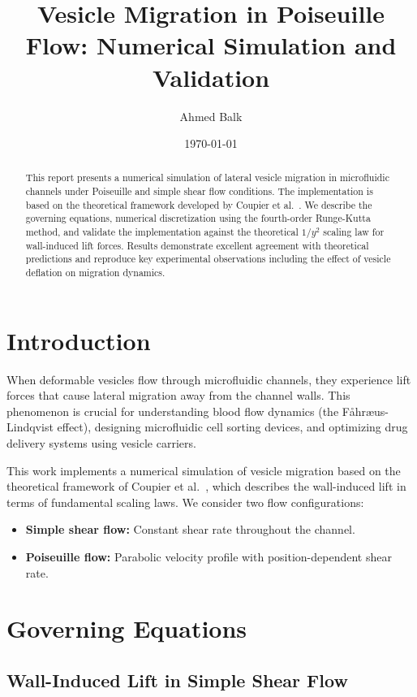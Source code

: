 \documentclass{article}
\title{Vesicle Migration in Poiseuille Flow: Numerical Simulation and Validation}
\author{Ahmed Balk}
\date{\today}
\begin{document}
\maketitle 
{}

\begin{abstract}
This report presents a numerical simulation of lateral vesicle migration in microfluidic 
channels under Poiseuille and simple shear flow conditions. 
The implementation is based on the theoretical framework developed 
by Coupier et al.~\cite{coupier2009}. We describe the governing equations,
numerical discretization using the fourth-order Runge-Kutta method, 
and validate the implementation against the theoretical $1/y^2$ scaling law 
for wall-induced lift forces. Results demonstrate excellent agreement with 
theoretical predictions and reproduce key experimental observations including 
the effect of vesicle deflation on migration dynamics.
\end{abstract}

\section{Introduction}

When deformable vesicles flow through microfluidic channels, 
they experience lift forces that cause lateral migration away 
from the channel walls. This phenomenon is crucial for understanding
blood flow dynamics (the F\aa hr\ae us-Lindqvist effect), 
designing microfluidic cell sorting devices, and optimizing drug 
delivery systems using vesicle carriers.

This work implements a numerical simulation of vesicle migration 
based on the theoretical framework of Coupier et al.~\cite{coupier2009}, 
which describes the wall-induced lift in terms of fundamental scaling laws. 
We consider two flow configurations:
\begin{itemize}
    \item \textbf{Simple shear flow:} Constant shear rate throughout the channel.
    \item \textbf{Poiseuille flow:} Parabolic velocity profile with position-dependent shear rate.
\end{itemize}

\section{Governing Equations}

\subsection{Wall-Induced Lift in Simple Shear Flow}
\end{document}
